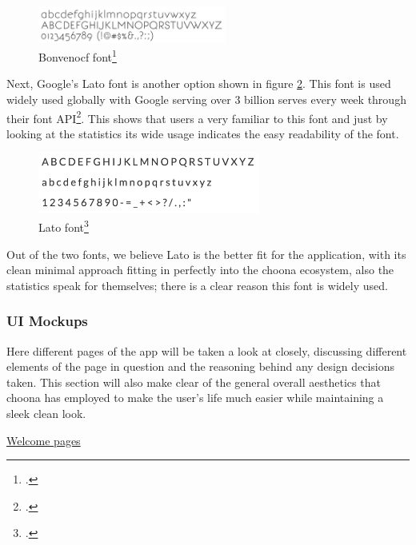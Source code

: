 \begin{figure}[h!]
\centering
\includegraphics[width=0.55\textwidth]{./img/bonvenocf.png}
\caption{Bonvenocf font\footcite{bonvenocf}}
\label{fig:Bonvenocf}
\end{figure}

Next, Google's Lato font is another option shown in figure \ref{fig:lato}. This font is used widely used globally with Google serving over 3 billion serves every week through their font API\footcite{googlelato}. This shows that users a very familiar to this font and just by looking at the statistics its wide usage indicates the easy readability of the font.

\begin{figure}[h!]
\centering
\includegraphics[width=0.65\textwidth]{./img/lato.png}
\caption{Lato font\footcite{googlelato}}
\label{fig:lato}
\end{figure}

Out of the two fonts, we believe Lato is the better fit for the application, with its clean minimal approach fitting in perfectly into the choona ecosystem, also the statistics speak for themselves; there is a clear reason this font is widely used.\\

\subsubsection*{UI Mockups}

Here different pages of the app will be taken a look at closely, discussing different elements of the page in question and the reasoning behind any design decisions taken. This section will also make clear of the general overall aesthetics that choona has employed to make the user's life much easier while maintaining a sleek clean look.\\

\clearpage

\noindent\underline{Welcome pages}\newline

